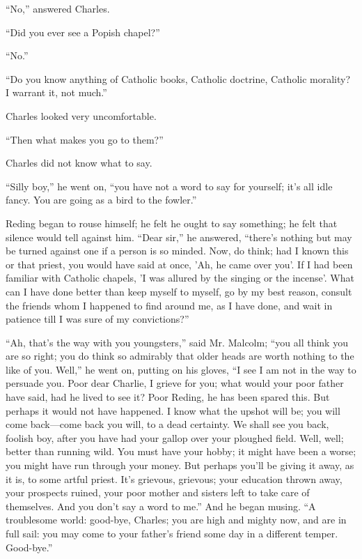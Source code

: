 ``No,'' answered Charles.

``Did you ever see a Popish chapel?''

``No.''

``Do you know anything of Catholic books, Catholic doctrine,
Catholic morality? I warrant it, not much.''

Charles looked very uncomfortable.

``Then what makes you go to them?''

Charles did not know what to say.

``Silly boy,'' he went on, ``you have not a word to say
for yourself; it's all idle fancy. You are going as a bird to the
fowler.''

Reding began to rouse himself; he felt he ought to say something;
he felt that silence would tell against him. ``Dear sir,'' he
answered, ``there's nothing but may be turned against one if a
person is so minded. Now, do think; had I known this or that
priest, you would have said at once, 'Ah, he came over you'. If I had
been familiar with Catholic chapels, 'I was allured by the singing or
the incense'. What can I have done better than keep myself to myself,
go by my best reason, consult the friends whom I happened to find
around me, as I have done, and wait in patience till I was sure of my
convictions?''

``Ah, that's the way with you youngsters,'' said Mr.
Malcolm; ``you all think you are so right; you do think so
admirably that older heads are worth nothing to the like of you.
Well,'' he went on, putting on his gloves, ``I see I am not in
the way to persuade you. Poor dear Charlie, I grieve for you; what
would your poor father have said, had he lived to see it? Poor Reding,
he has been spared this. But perhaps it would not have happened. I
know what the upshot will be; you will come back—come back you will,
to a dead certainty. We shall see you back, foolish boy, after you
have had your gallop over your ploughed field. Well, well; better than
running wild. You must have your hobby; it might have been a worse;
you might have run through your money. But perhaps you'll be giving it
away, as it is, to some artful priest. It's grievous, grievous; your
education thrown away, your prospects ruined, your poor mother and
sisters left to take care of themselves. And you don't say a word to
me.'' And he began musing. ``A troublesome world: good-bye,
Charles; you are high and mighty now, and are in full sail: you may
come to your father's friend some day in a different temper.
Good-bye.''

